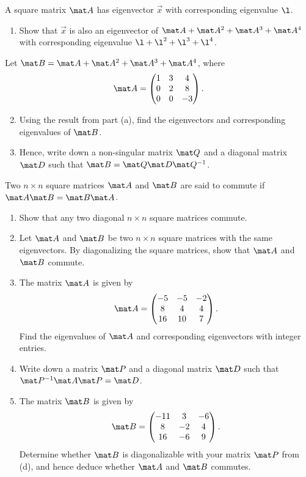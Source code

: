 \begin{problem}
    A square matrix $\mat A$ has eigenvector $\vec x$ with corresponding eigenvalue $\l$.

    \begin{enumerate}
        \item Show that $\vec x$ is also an eigenvector of $\mat A + \mat A^2 + \mat A^3 + \mat A^4$ with corresponding eigenvalue $\l + \l^2 + \l^3 + \l^4$.
    \end{enumerate}

    Let $\mat B = \mat A + \mat A^2 + \mat A^3 + \mat A^4$, where \[\mat A = \begin{pmatrix}1 & 3 & 4 \\ 0 & 2 & 8 \\ 0 & 0 & -3\end{pmatrix}.\]

    \begin{enumerate}
        \setcounter{enumi}{1}
        \item Using the result from part (a), find the eigenvectors and corresponding eigenvalues of $\mat B$.
        \item Hence, write down a non-singular matrix $\mat Q$ and a diagonal matrix $\mat D$ such that $\mat B = \mat Q \mat D \mat Q^{-1}$.
    \end{enumerate}
\end{problem}

\begin{problem}
    Two $n \times n$ square matrices $\mat A$ and $\mat B$ are said to commute if $\mat A \mat B = \mat B \mat A$.

    \begin{enumerate}
        \item Show that any two diagonal $n \times n$ square matrices commute.
        \item Let $\mat A$ and $\mat B$ be two $n \times n$ square matrices with the same eigenvectors. By diagonalizing the square matrices, show that $\mat A$ and $\mat B$ commute.
        \item The matrix $\mat A$ is given by \[\mat A = \begin{pmatrix}-5 & -5 & -2 \\ 8 & 4 & 4 \\ 16 & 10 & 7\end{pmatrix}.\] Find the eigenvalues of $\mat A$ and corresponding eigenvectors with integer entries.
        \item Write down a matrix $\mat P$ and a diagonal matrix $\mat D$ such that $\mat P^{-1} \mat A \mat P = \mat D$.
        \item The matrix $\mat B$ is given by \[\mat B = \begin{pmatrix}-11 & 3 & -6 \\ 8 & -2  & 4 \\ 16 & -6 & 9\end{pmatrix}.\] Determine whether $\mat B$ is diagonalizable with your matrix $\mat P$ from (d), and hence deduce whether $\mat A$ and $\mat B$ commutes.
    \end{enumerate}
\end{problem}

